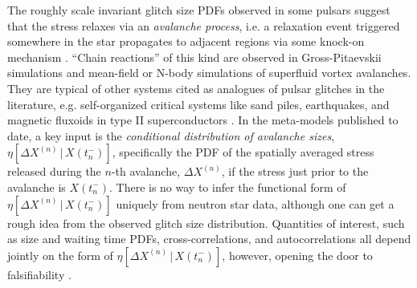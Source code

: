 The roughly scale invariant glitch size PDFs observed in some pulsars suggest that the stress relaxes via an \emph{avalanche process}, i.e. a relaxation event triggered somewhere in the star propagates to adjacent regions via some knock-on mechanism \citep{Jensen1998, Melatos2008}. ``Chain reactions'' of this kind are observed in Gross-Pitaevskii simulations \citep{Warszawski2011, Warszawski2012, Warszawski2013, Lonnborn2019} and mean-field or N-body simulations \citep{Khomenko2018, Howitt2020} of superfluid vortex avalanches. They are typical of other systems cited as analogues of pulsar glitches in the literature, e.g. self-organized critical systems like sand piles, earthquakes, and magnetic fluxoids in type II superconductors \citep{Field1995, Jensen1998, Aschwanden2018}. In the meta-models published to date, a key input is the \emph{conditional distribution of avalanche sizes}, $\eta[\Delta X^{(n)}\,|\,X(t_{n}^-)]$, specifically the PDF of the spatially averaged stress released during the $n$-th avalanche, $\Delta X^{(n)}$, if the stress just prior to the avalanche is $X(t_{n}^-)$. There is no way to infer the functional form of $\eta[\Delta X^{(n)}\,|\,X(t_{n}^-)]$ uniquely from neutron star data, although one can get a rough idea from the observed glitch size distribution. Quantities of interest, such as size and waiting time PDFs, cross-correlations, and autocorrelations all depend jointly on the form of $\eta[\Delta X^{(n)}\,|\,X(t_{n}^-)]$, however, opening the door to falsifiability \citep{Carlin2019quasi, Carlin2019ac, Carlin2020bsa}. 

